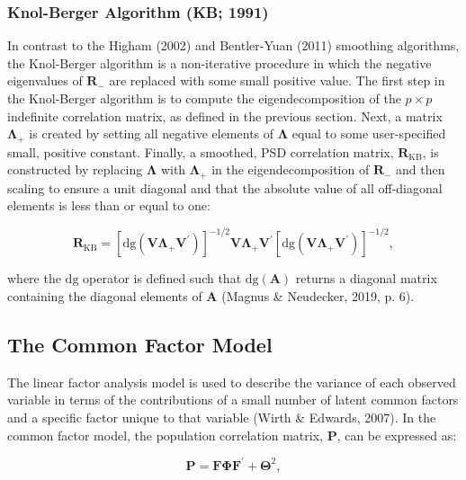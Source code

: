 \documentclass[
  english,
  man]{apa6}
\begin{document}
\hypertarget{knol-berger-algorithm-kb-1991}{%
\subsubsection{Knol-Berger Algorithm (KB; 1991)}\label{knol-berger-algorithm-kb-1991}}

In contrast to the Higham (2002) and Bentler-Yuan (2011) smoothing algorithms, the Knol-Berger algorithm is a non-iterative procedure in which the negative eigenvalues of \(\mathbf{R}_{-}\) are replaced with some small positive value. The first step in the Knol-Berger algorithm is to compute the eigendecomposition of the \(p \times p\) indefinite correlation matrix, as defined in the previous section. Next, a matrix \(\mathbf{\Lambda_+}\) is created by setting all negative elements of \(\mathbf{\Lambda}\) equal to some user-specified small, positive constant. Finally, a smoothed, PSD correlation matrix, \(\mathbf{R}_{\textrm{KB}}\), is constructed by replacing \(\mathbf{\Lambda}\) with \(\mathbf{\Lambda_+}\) in the eigendecomposition of \(\mathbf{R}_{-}\) and then scaling to ensure a unit diagonal and that the absolute value of all off-diagonal elements is less than or equal to one:

\begin{equation}
\mathbf{R}_{\textrm{KB}}= [\textrm{dg}(\mathbf{V \Lambda_+ V}^\prime)]^{-1/2} \mathbf{V \Lambda_+ V}^\prime [\textrm{dg}(\mathbf{V \Lambda_+ V}^\prime)]^{-1/2},
\label{eq:Rkb}
\end{equation}

where the \(\textrm{dg}\) operator is defined such that \(\textrm{dg}(\mathbf{A})\) returns a diagonal matrix containing the diagonal elements of \(\mathbf{A}\) (Magnus \& Neudecker, 2019, p. 6).

\hypertarget{the-common-factor-model}{%
\subsection{The Common Factor Model}\label{the-common-factor-model}}

The linear factor analysis model is used to describe the variance of each observed variable in terms of the contributions of a small number of latent common factors and a specific factor unique to that variable (Wirth \& Edwards, 2007). In the common factor model, the population correlation matrix, \(\mathbf{P}\), can be expressed as:

\begin{equation}
\mathbf{P} = \mathbf{F} \mathbf{\Phi} \mathbf{F}^{\prime} + \mathbf{\Theta}^2,
\label{eq:cfa}
\end{equation}
\end{document}
